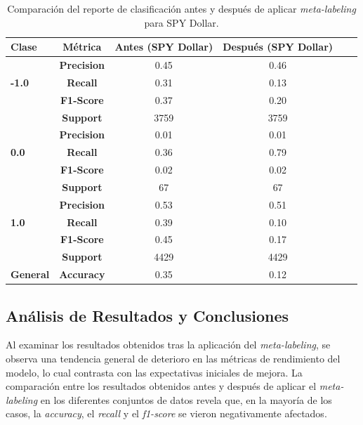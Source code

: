 \documentclass[a4paper,12pt, twoside]{report}
\begin{document}
\begin{table}[h!]
    \centering
    \begin{tabular}{lccccc}
    \hline
    \textbf{Clase} & \textbf{Métrica} & \textbf{Antes (SPY Dollar)} & \textbf{Después (SPY Dollar)} \\
    \hline
    \multirow{3}{*}{\textbf{-1.0}} & \textbf{Precision} & 0.45 & 0.46 \\
                                   & \textbf{Recall}    & 0.31 & 0.13 \\
                                   & \textbf{F1-Score}  & 0.37 & 0.20 \\
                                   & \textbf{Support}   & 3759 & 3759 \\
    \hline
    \multirow{3}{*}{\textbf{0.0}} & \textbf{Precision}  & 0.01 & 0.01 \\
                                  & \textbf{Recall}     & 0.36 & 0.79 \\
                                  & \textbf{F1-Score}   & 0.02 & 0.02 \\
                                  & \textbf{Support}    & 67 & 67 \\
    \hline
    \multirow{3}{*}{\textbf{1.0}} & \textbf{Precision}  & 0.53 & 0.51 \\
                                  & \textbf{Recall}     & 0.39 & 0.10 \\
                                  & \textbf{F1-Score}   & 0.45 & 0.17 \\
                                  & \textbf{Support}    & 4429 & 4429 \\
    \hline
    \textbf{General} & \textbf{Accuracy} & 0.35 & 0.12 \\
    \hline
    \end{tabular}
    \caption{Comparación del reporte de clasificación antes y después de aplicar \textit{meta-labeling} para SPY Dollar.}
    \label{tab:classification_report_spy_dollar}
\end{table}
    

\subsection{Análisis de Resultados y Conclusiones}

Al examinar los resultados obtenidos tras la aplicación del \textit{meta-labeling}, se observa una tendencia general de 
deterioro en las métricas de rendimiento del modelo, lo cual contrasta con las expectativas iniciales de mejora. La 
comparación entre los resultados obtenidos antes y después de aplicar el \textit{meta-labeling} en los diferentes 
conjuntos de datos revela que, en la mayoría de los casos, la \textit{accuracy}, el \textit{recall} y el \textit{f1-score} 
se vieron negativamente afectados.
\end{document}
